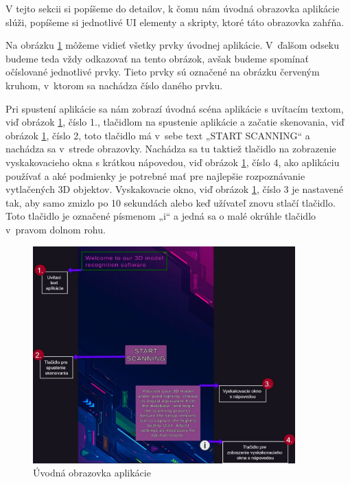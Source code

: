 V tejto sekcii si popíšeme do detailov, k čomu nám úvodná obrazovka aplikácie slúži, popíšeme si jednotlivé UI elementy a skripty, ktoré táto obrazovka zahŕňa.



Na obrázku \ref{fig:introductionScene} môžeme vidieť všetky prvky úvodnej aplikácie. V~ďalšom odseku budeme teda vždy odkazovať na tento obrázok, avšak budeme spomínať očíslované jednotlivé prvky. Tieto prvky sú označené na obrázku červeným kruhom, v~ktorom sa nachádza číslo daného prvku. 

Pri spustení aplikácie sa nám zobrazí úvodná scéna aplikácie s uvítacím textom, viď obrázok \ref{fig:introductionScene}, číslo 1., tlačidlom na spustenie aplikácie a začatie skenovania, viď obrázok \ref{fig:introductionScene}, číslo 2, toto tlačidlo má v~sebe text „START SCANNING“ a nachádza sa v~strede obrazovky. Nachádza sa tu taktiež tlačidlo na zobrazenie vyskakovacieho okna s krátkou nápovedou, viď obrázok \ref{fig:introductionScene}, číslo 4, ako aplikáciu používať a aké podmienky je potrebné mať pre najlepšie rozpoznávanie vytlačených 3D objektov. Vyskakovacie okno, viď obrázok \ref{fig:introductionScene}, číslo 3 je nastavené tak, aby samo zmizlo po 10 sekundách alebo keď užívateľ znovu stlačí tlačidlo. Toto tlačidlo je označené písmenom „i“ a jedná sa o malé okrúhle tlačidlo v~pravom dolnom rohu.

\begin{figure}[h]
  \centering
  \includegraphics[width=0.9\textwidth]{img/Introduction_scene.jpg}
  \caption{Úvodná obrazovka aplikácie}
  \label{fig:introductionScene}
\end{figure}

